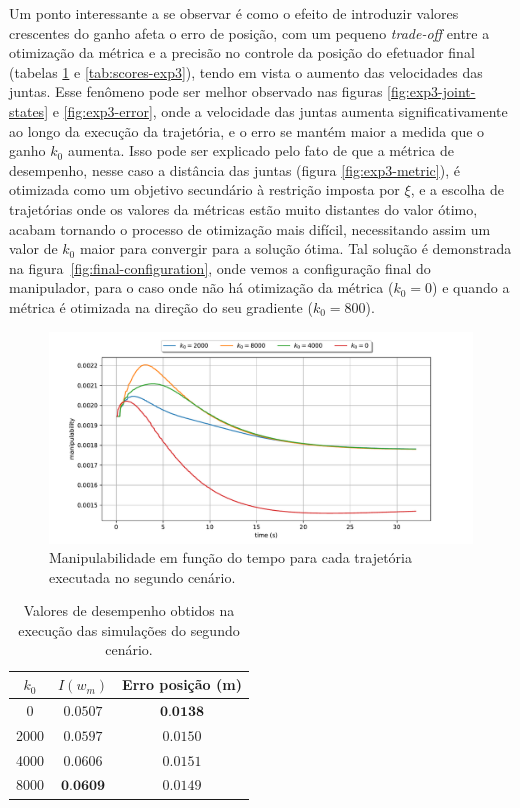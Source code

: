 Um ponto interessante a se observar é como o efeito de introduzir valores crescentes do ganho afeta o erro de posição, 
com um pequeno \emph{trade-off} entre a otimização da métrica e a precisão no controle da posição 
do efetuador final (tabelas \ref*{tab:scores-exp2} e \ref*{tab:scores-exp3}), tendo em vista o aumento das 
velocidades das juntas. Esse fenômeno pode ser melhor observado nas figuras \ref*{fig:exp3-joint-states} e 
\ref*{fig:exp3-error}, onde a velocidade das juntas aumenta significativamente ao longo da execução da trajetória, 
e o erro se mantém maior a medida que o ganho \(k_0\) aumenta. Isso pode ser explicado pelo fato 
de que a métrica de desempenho, nesse caso a distância das juntas (figura \ref*{fig:exp3-metric}), é otimizada como 
um objetivo secundário à restrição imposta por \(\xi\), e a escolha de trajetórias onde os valores da métricas estão 
muito distantes do valor ótimo, acabam tornando o processo de otimização mais difícil, necessitando assim um valor 
de \(k_0\) maior para convergir para a solução ótima. Tal solução é demonstrada na 
figura~\ref{fig:final-configuration}, onde vemos a configuração final do manipulador, para o caso onde não há otimização 
da métrica (\(k_0=0\)) e quando a métrica é otimizada na direção do seu gradiente (\(k_0=800\)).

\begin{figure}
	\centering
	\includegraphics[width=\textwidth]{./Images/2024-06-11-09-17-48/metric_manipulability.pdf}
	\caption{Manipulabilidade em função do tempo para cada trajetória executada no segundo cenário.}\label{fig:exp2-metric}
\end{figure}

\begin{table}[htbp]
    \centering
    \begin{tabular}{ccc}
        \toprule
        \( k_0 \) & \( I(w_m) \)  & Erro posição (m) \\
        \midrule
        0  & \( 0.0507 \) & \( \textbf{0.0138} \) \\
        2000  & \( 0.0597 \) & \( 0.0150 \) \\
        4000  & \( 0.0606 \) & \( 0.0151 \) \\
        8000  & \( \textbf{0.0609} \) & \( 0.0149 \) \\
        \bottomrule
    \end{tabular}
    \caption{Valores de desempenho obtidos na execução das simulações do segundo cenário.}
    \label{tab:scores-exp2}
\end{table}

